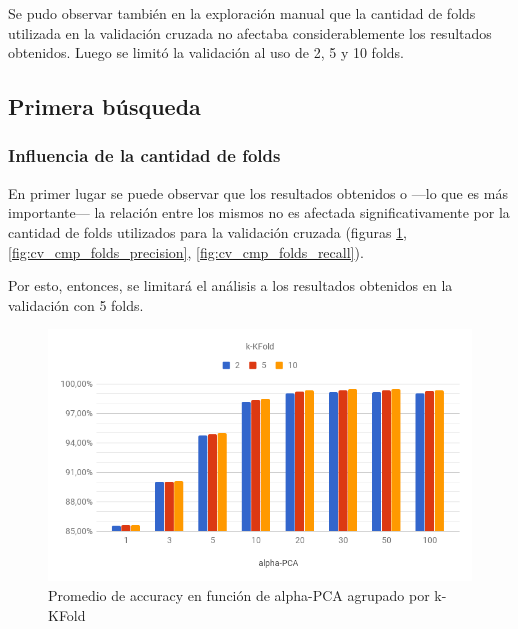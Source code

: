 Se pudo observar también en la exploración manual que la cantidad de folds utilizada en la validación cruzada no afectaba considerablemente los resultados obtenidos. Luego se limitó la validación al uso de 2, 5 y 10 folds.

\subsection{Primera búsqueda}

\subsubsection{Influencia de la cantidad de folds}

En primer lugar se puede observar que los resultados obtenidos o ---lo que es más importante--- la relación entre los mismos no es afectada significativamente por la cantidad de folds utilizados para la validación cruzada (figuras \ref{fig:cv_cmp_folds_accuracy}, \ref{fig:cv_cmp_folds_precision}, \ref{fig:cv_cmp_folds_recall}).

Por esto, entonces, se limitará el análisis a los resultados obtenidos en la validación con 5 folds.

\begin{figure}
    \centering
    \includegraphics[width=\textwidth]{graficos/cv_cmp_folds_accuracy.png}
    \caption{Promedio de accuracy en función de alpha-PCA agrupado por k-KFold}
    \label{fig:cv_cmp_folds_accuracy}
\end{figure}

